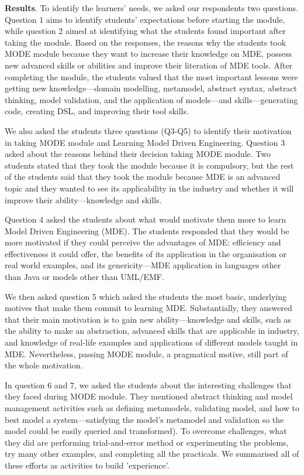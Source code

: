 \documentclass[12pt, a4paper]{report}
\begin{document}
\textbf{Results}. To identify the learners' needs, we asked our respondents two questions. Question 1 aims to identify students' expectations before starting the module, while question 2 aimed at identifying what the students found important after taking the module. Based on the responses, the reasons why the students took MODE module because they want to increase their knowledge on MDE, possess new advanced skills or abilities and improve their literation of MDE tools. After completing the module, the students valued that the most important lessons were getting new knowledge---domain modelling, metamodel, abstract syntax, abstract thinking, model validation, and the application of models---and skills---generating code, creating DSL, and improving their tool skills. 

We also asked the students three questions (Q3-Q5) to identify their motivation
in taking MODE module and Learning Model Driven Engineering. Question 3 asked
about the reasons behind their decision taking MODE module. Two students stated
that they took the module because it is compulsory, but the rest of the students
said that they took the module because MDE is an advanced topic and they wanted
to see its applicability in the industry and whether it will improve their
ability---knowledge and skills.

Question 4 asked the students about what would motivate them more to learn Model
Driven Engineering (MDE). The students responded that they would be more
motivated if they could perceive the advantages of MDE: efficiency and
effectiveness it could offer, the benefits of its application in the
organisation or real world examples, and its genericity---MDE application in
languages other than Java or models other than UML/EMF.

We then asked question 5 which asked the students the most basic, underlying motives that make them commit to learning MDE. Substantially, they answered that their main motivation is to gain new ability---knowledge and skills, such as the ability to make an abstraction, advanced skills that are applicable in industry, and knowledge of real-life examples and applications of different models taught in MDE. Nevertheless, passing MODE module, a pragmatical motive, still part of the whole motivation. 

In question 6 and 7, we asked the students about the interesting challenges that they faced during MODE module. They mentioned abstract thinking and model management activities such as defining metamodels, validating model, and how to best model a system---satisfying the model's metamodel and validation so the model could be easily queried and transformed). To overcome challenges, what they did are performing trial-and-error method or experimenting the problems, try many other examples, and completing all the practicals. We summarised all of these efforts as activities to build 'experience'.
\end{document}
